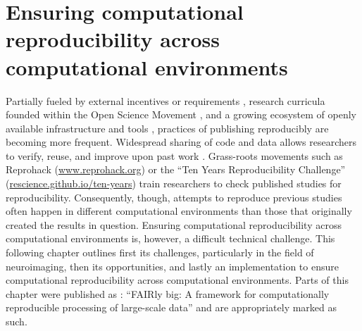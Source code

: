 


\chapter{Ensuring computational reproducibility across computational environments}
\label{chap:k3}

Partially fueled by external incentives or requirements \citep{mckiernan2016open} \citep{dfg}, research curricula founded within the Open Science Movement \citep{munafo2017manifesto} \citep{poldrack2017scanning}, and a growing ecosystem of openly available infrastructure and tools \citep{NISO2022119623}, practices of publishing reproducibly are becoming more frequent.
Widespread sharing of code and data allows researchers to verify, reuse, and improve upon past work \citep{borghi2018data}.
Grass-roots movements such as Reprohack (\href{https://www.reprohack.org/}{www.reprohack.org}) or the ``Ten Years Reproducibility Challenge'' (\href{https://rescience.github.io/ten-years/}{rescience.github.io/ten-years}) train researchers to check published studies for reproducibility.
Consequently, though, attempts to reproduce previous studies often happen in different computational environments than those that originally created the results in question.
Ensuring computational reproducibility across computational environments is, however, a difficult technical challenge.
This following chapter outlines first its challenges, particularly in the field of neuroimaging, then its opportunities, and lastly an implementation to ensure computational reproducibility across computational environments.
Parts of this chapter were published as \citet{wagner2022fairly}: ``FAIRly big: A framework for computationally reproducible processing of large-scale data'' and are appropriately marked as such.


